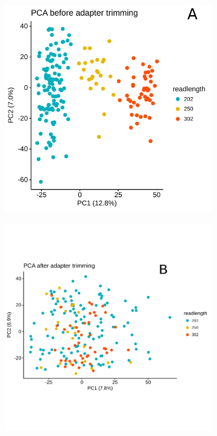 \begin{figure}
	\centering
	\begin{subfigure}[t]{0.55\columnwidth}
		\includegraphics[width=\columnwidth]{./Figures/pca_readlengthOld.pdf}
		\subcaption*{}
		\label{fig:PCA_readlengthOld}
	\end{subfigure}
	\quad
	\begin{subfigure}[t]{0.6\columnwidth}
		\includegraphics[width=\columnwidth]{./Figures/pca_readlengthtrimmed.pdf}

\end{subfigure}
\end{figure}
